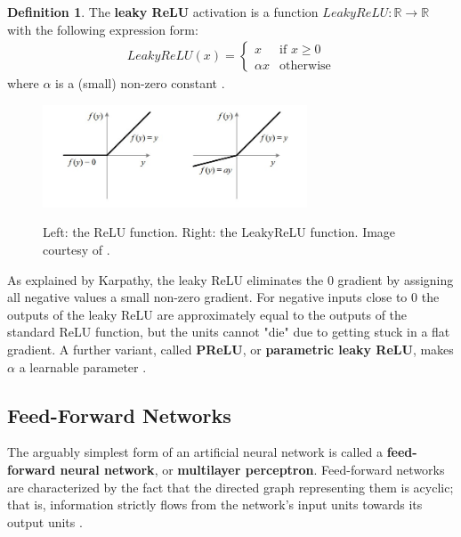 \documentclass[12pt, titlepage]{report}
\theoremstyle{definition}
\newtheorem{definition}{Definition}
\begin{document}
\begin{definition}
The \textbf{leaky ReLU} activation is a function $LeakyReLU: \mathbb{R} \rightarrow \mathbb{R}$ with the following expression form:
\begin{gather}\label{eq:leakyrelu}
LeakyReLU(x) = 
\begin{cases}
    x 							 & \text{if } x\geq 0\\
    \alpha{x}             & \text{otherwise}
\end{cases}
\end{gather}
where $\alpha$ is a (small) non-zero constant \cite[Neural Networks Part 1: Setting up the Architecture]{karpathy2017cs231n}.
\end{definition}

\begin{figure}
\centering
\includegraphics[width=0.7\textwidth]{img/relu.jpg}\\
\caption{Left: the ReLU function. Right: the LeakyReLU function. Image courtesy of \cite{sharma2017activation}.}
\label{figure:relu}
\end{figure}

As explained by Karpathy, the leaky ReLU eliminates the 0 gradient by assigning all negative values a small non-zero gradient. For negative inputs close to 0 the outputs of the leaky ReLU are approximately equal to the outputs of the standard ReLU function, but the units cannot "die" due to getting stuck in a flat gradient. A further variant, called \textbf{PReLU}, or \textbf{parametric leaky ReLU}, makes $\alpha$ a learnable parameter  \cite[Neural Networks Part 1: Setting up the Architecture]{karpathy2017cs231n}.



\subsection{Feed-Forward Networks}
The arguably simplest form of an artificial neural network is called a \textbf{feed-forward neural network}, or \textbf{multilayer perceptron}. Feed-forward networks are characterized by the fact that the directed graph representing them is acyclic; that is, information strictly flows from the network's input units towards its output units \cite[p. 164]{goodfellow2016deep}.
\end{document}
